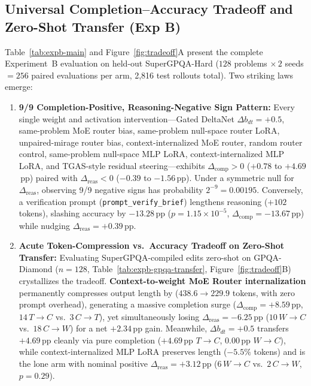 \documentclass[10pt]{article}
\begin{document}
\subsection{Universal Completion--Accuracy Tradeoff and Zero-Shot Transfer (Exp B)}
\label{sec:expb}

Table~\ref{tab:expb-main} and Figure~\ref{fig:tradeoff}A present the complete Experiment~B evaluation on held-out SuperGPQA-Hard ($128$ problems $\times\, 2$ seeds $= 256$ paired evaluations per arm, 2,816 test rollouts total). Two striking laws emerge:

\begin{enumerate}[leftmargin=1.4em,itemsep=2pt,topsep=2pt]
    \item \textbf{9/9 Completion-Positive, Reasoning-Negative Sign Pattern:} Every single weight and activation intervention---Gated DeltaNet $\Delta b_{dt}=+0.5$, same-problem MoE router bias, same-problem null-space router LoRA, unpaired-mirage router bias, context-internalized MoE router, random router control, same-problem null-space MLP LoRA, context-internalized MLP LoRA, and TGAS-style residual steering---exhibits $\Delta_{\mathrm{comp}} > 0$ ($+0.78$ to $+4.69$\,pp) paired with $\Delta_{\mathrm{reas}} < 0$ ($-0.39$ to $-1.56$\,pp). Under a symmetric null for $\Delta_{\mathrm{reas}}$, observing 9/9 negative signs has probability $2^{-9} = 0.00195$. Conversely, a verification prompt (\texttt{prompt\_verify\_brief}) lengthens reasoning ($+102$\,tokens), slashing accuracy by $-13.28$\,pp ($p=1.15\times 10^{-5}$, $\Delta_{\mathrm{comp}}=-13.67$\,pp) while nudging $\Delta_{\mathrm{reas}}=+0.39$\,pp.
    \item \textbf{Acute Token-Compression vs.\ Accuracy Tradeoff on Zero-Shot Transfer:} Evaluating SuperGPQA-compiled edits zero-shot on GPQA-Diamond ($n=128$, Table~\ref{tab:expb-gpqa-transfer}, Figure~\ref{fig:tradeoff}B) crystallizes the tradeoff. \textbf{Context-to-weight MoE Router internalization} permanently compresses output length by \textbf{\GPQATokCut{}} ($438.6 \to 229.9$ tokens, with zero prompt overhead), generating a massive completion surge ($\Delta_{\mathrm{comp}}=+8.59$\,pp, $14\,T\!\to\!C$ vs.\ $3\,C\!\to\!T$), yet simultaneously losing $\Delta_{\mathrm{reas}}=-6.25$\,pp ($10\,W\!\to\!C$ vs.\ $18\,C\!\to\!W$) for a net $+2.34$\,pp gain. Meanwhile, $\Delta b_{dt}=+0.5$ transfers $+4.69$\,pp cleanly via pure completion ($+4.69$\,pp $T\!\to\!C$, $0.00$\,pp $W\!\to\!C$), while context-internalized MLP LoRA preserves length ($-5.5\%$ tokens) and is the lone arm with nominal positive $\Delta_{\mathrm{reas}}=+3.12$\,pp ($6\,W\!\to\!C$ vs.\ $2\,C\!\to\!W$, $p=0.29$).
\end{enumerate}
\end{document}
